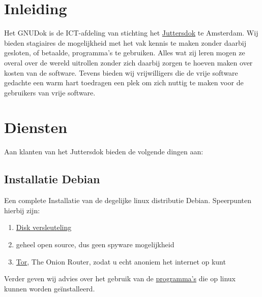 
\section{Inleiding}

Het GNUDok is de ICT-afdeling van stichting het \href{http://www.juttersdok.nl/}{Juttersdok} te Amsterdam. Wij bieden stagiaires de mogelijkheid met het vak kennis te maken zonder daarbij gesloten, of betaalde, programma's te gebruiken. Alles wat zij leren mogen ze overal over de wereld uitrollen zonder zich daarbij zorgen te hoeven maken over kosten van de software. Tevens bieden wij vrijwilligers die de vrije software gedachte een warm hart toedragen een plek om zich nuttig te maken voor de gebruikers van vrije software.

\section{Diensten}

Aan klanten van het Juttersdok bieden de volgende dingen aan:

\subsection{Installatie Debian}

Een complete Installatie van de degelijke linux distributie Debian.
Speerpunten hierbij zijn:

\begin{enumerate}
	\item \href{https://wiki.archlinux.org/index.php/Disk_encryption}{Disk versleuteling}
		\item geheel open source, dus geen spyware mogelijkheid
		\item \href{https://www.torproject.org}{Tor}, The Onion Router, zodat u echt anoniem het internet op kunt
\end{enumerate}


Verder geven wij advies over het gebruik van de \href{https://packages.debian.org/stable/}{programma's} die op linux kunnen worden ge\"{i}nstalleerd.

